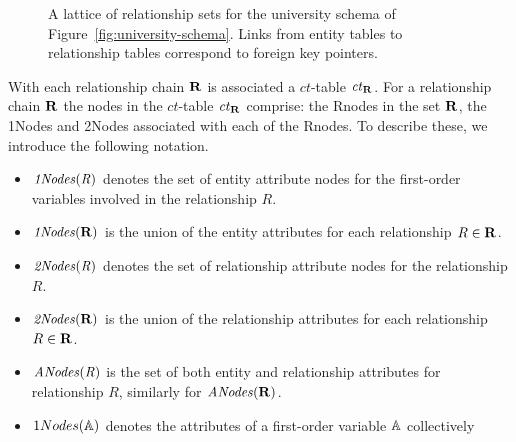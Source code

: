 \documentclass{vldb}
\newcommand{\ct}{\mathit{ct}}
\begin{document}
\begin{figure}[htbp]
\begin{center}
\caption{A lattice of relationship sets for the university schema of Figure~\ref{fig:university-schema}.
 Links from entity tables to relationship tables correspond to foreign key pointers. 
\label{fig:big-lattice}}
\end{center}
\end{figure}




With each relationship chain $\mathbf{R}$ is associated a $\ct$-table $\ct_{\set{\Relation}}$. 
For a relationship chain $\mathbf{R}$ the nodes in the $\ct$-table  $\ct_{\set{\Relation}}$%
 comprise: the Rnodes in the set $\mathbf{R}$, the 1Nodes and 2Nodes associated with each of the Rnodes. To describe these, we introduce the following notation.

\begin{itemize}
\item $\it{1Nodes}(R)$ denotes the set of entity attribute nodes for the first-order variables involved in the relationship $R$. 
\item $\it{1Nodes}(\mathbf{R})$ is the union of the entity attributes for each relationship $R \in \mathbf{R}$.
\item $\it{2Nodes}(R)$ denotes the set of relationship attribute nodes for %
the relationship $R$.
\item $\it{2Nodes}(\mathbf{R})$ is the union of the relationship attributes for each relationship $R \in \mathbf{R}$.
\item $\it{ANodes}(R)$ is the set of both entity and relationship attributes for relationship $R$, similarly for $\it{ANodes}({\mathbf{R}})$.
\item  $1Nodes(\mathbb{A})$ denotes the attributes of a first-order variable $\mathbb{A}$ collectively
\end{itemize}
\end{document}
